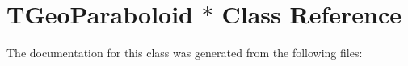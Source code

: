 \hypertarget{class_t_geo_paraboloid_01_5}{
\section{TGeoParaboloid $\ast$ Class Reference}
\label{class_t_geo_paraboloid_01_5}
}


The documentation for this class was generated from the following files: